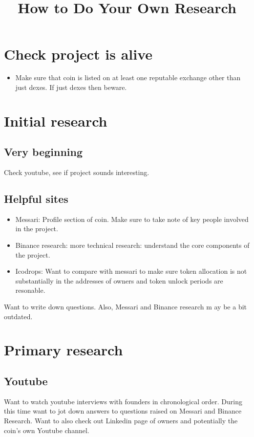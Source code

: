 \documentclass{../notes}
\title{How to Do Your Own Research}
\begin{document}
\maketitle

\section{Check project is alive}
\begin{itemize}
    \item Make sure that coin is listed on at least one reputable exchange other than just dexes. If just dexes then beware. 
\end{itemize}

\section{Initial research}
\subsection{Very beginning}
Check youtube, see if project sounds interesting. 

\subsection{Helpful sites}
\begin{itemize}
    \item Messari: Profile section of coin. Make sure to take note of key people involved in the project. 
    \item Binance research: more technical research: understand the core components of the project. 
    \item Icodrops: Want to compare with messari to make sure token allocation is not substantially in the addresses of owners and token unlock periods are resonable. 
\end{itemize}
Want to write down questions. Also, Messari and Binance research m ay be a bit outdated.  

\section{Primary research}
\subsection{Youtube}
Want to watch youtube interviews with founders in chronological order. During this time want to jot down answers to questions raised on Messari and Binance Research. Want to also check out Linkedin page of owners and potentially the coin's own Youtube channel. 
\end{document}
